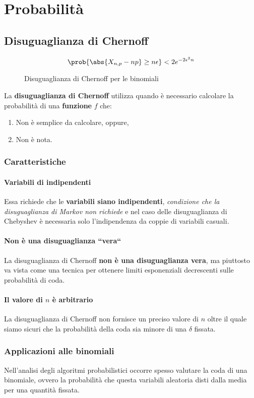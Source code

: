 \documentclass[\main/main.tex]{subfiles}
\begin{document}
\chapter{Probabilità}
\section{Disuguaglianza di Chernoff}
\begin{figure}
  \[
    \prob{\abs{X_{n,p} - np} \geq n\epsilon} < 2e^{-2\epsilon^2 n}
  \]
  \caption{Disuguaglianza di Chernoff per le binomiali}
\end{figure}
La \textbf{disuguaglianza di Chernoff} utilizza quando è necessario calcolare la probabilità di una \textbf{funzione} \(f\) che:
\begin{enumerate}
  \item Non è semplice da calcolare, oppure,
  \item Non è nota.
\end{enumerate}

\subsection{Caratteristiche}
\subsubsection{Variabili di indipendenti}
Essa richiede che le \textbf{variabili siano indipendenti}, \textit{condizione che la disuguaglianza di Markov non richiede} e nel caso delle disuguaglianza di Chebyshev è necessaria solo l'indipendenza da coppie di variabili casuali.

\subsubsection{Non è una disuguaglianza “vera“}
La disuguaglianza di Chernoff \textbf{non è una disuguaglianza vera}, ma piuttosto va vista come una tecnica per ottenere limiti esponenziali decrescenti sulle probabilità di coda.

\subsubsection{Il valore di \(n\) è arbitrario}
La disuguaglianza di Chernoff non fornisce un preciso valore di \(n\) oltre il quale siamo sicuri che la probabilità della coda sia minore di una \(\delta \) fissata.

\subsection{Applicazioni alle binomiali}
Nell'analisi degli algoritmi probabilistici occorre spesso valutare la coda di una binomiale, ovvero la probabilità che questa variabili aleatoria disti dalla media per una quantità fissata.
\end{document}
